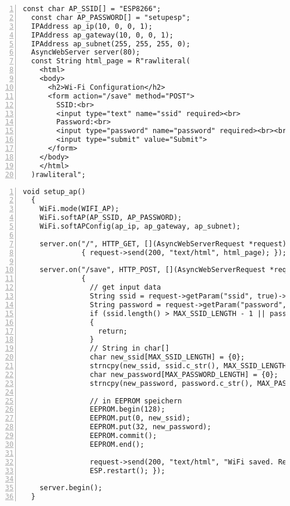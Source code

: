 \documentclass[12pt, letterpaper]{article}
\begin{document}
\begin{lstlisting}[frame=single, style=cpp, numbers=left, label={lst:esp8266defap}, caption={ESP8266: ap\_konfiguration}]
  const char AP_SSID[] = "ESP8266";
  const char AP_PASSWORD[] = "setupesp";
  IPAddress ap_ip(10, 0, 0, 1);
  IPAddress ap_gateway(10, 0, 0, 1);
  IPAddress ap_subnet(255, 255, 255, 0);
  AsyncWebServer server(80);
  const String html_page = R"rawliteral(
    <html>
    <body>
      <h2>Wi-Fi Configuration</h2>
      <form action="/save" method="POST">
        SSID:<br>
        <input type="text" name="ssid" required><br>
        Password:<br>
        <input type="password" name="password" required><br><br>
        <input type="submit" value="Submit">
      </form>
    </body>
    </html>
  )rawliteral";
\end{lstlisting}
\begin{lstlisting}[frame=single, style=cpp, numbers=left, label={lst:esp8266setupap}, caption={ESP: setup\_up}]
  void setup_ap()
  {
    WiFi.mode(WIFI_AP);
    WiFi.softAP(AP_SSID, AP_PASSWORD);
    WiFi.softAPConfig(ap_ip, ap_gateway, ap_subnet);
  
    server.on("/", HTTP_GET, [](AsyncWebServerRequest *request)
              { request->send(200, "text/html", html_page); });
  
    server.on("/save", HTTP_POST, [](AsyncWebServerRequest *request)
              {
                // get input data
                String ssid = request->getParam("ssid", true)->value();
                String password = request->getParam("password", true)->value();
                if (ssid.length() > MAX_SSID_LENGTH - 1 || password.length() > MAX_PASSWORD_LENGTH - 1)
                {
                  return;
                }
                // String in char[]
                char new_ssid[MAX_SSID_LENGTH] = {0};
                strncpy(new_ssid, ssid.c_str(), MAX_SSID_LENGTH - 1);
                char new_password[MAX_PASSWORD_LENGTH] = {0};
                strncpy(new_password, password.c_str(), MAX_PASSWORD_LENGTH - 1);
  
                // in EEPROM speichern
                EEPROM.begin(128);
                EEPROM.put(0, new_ssid);
                EEPROM.put(32, new_password);
                EEPROM.commit();
                EEPROM.end();
  
                request->send(200, "text/html", "WiFi saved. Rebooting...");
                ESP.restart(); });
  
    server.begin();
  }
\end{lstlisting}
\end{document}
